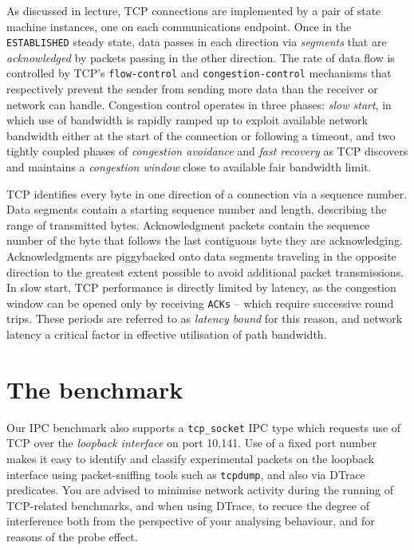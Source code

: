 \documentclass[a4paper,10pt]{article}
\begin{document}
As discussed in lecture, TCP connections are implemented by a pair of state
machine instances, one on each communications endpoint.
Once in the \texttt{ESTABLISHED} steady state, data passes in each direction
via \textit{segments} that are \textit{acknowledged} by packets passing in the
other direction.
The rate of data flow is controlled by TCP's \texttt{flow-control} and
\texttt{congestion-control} mechanisms that respectively prevent the sender
from sending more data than the receiver or network can handle.
Congestion control operates in three phases: \textit{slow start}, in which use
of bandwidth is rapidly ramped up to exploit available network bandwidth
either at the start of the connection or following a timeout, and two tightly
coupled phases of \textit{congestion avoidance} and \textit{fast recovery} as
TCP discovers and maintains a \textit{congestion window} close to available
fair bandwidth limit.

TCP identifies every byte in one direction of a connection via a sequence
number.
Data segments contain a starting sequence number and length, describing the
range of transmitted bytes.
Acknowledgment packets contain the sequence number of the byte that follows
the last contiguous byte they are acknowledging.
Acknowledgments are piggybacked onto data segments traveling in the opposite
direction to the greatest extent possible to avoid additional packet
transmissions.
In slow start, TCP performance is directly limited by latency, as the
congestion window can be opened only by receiving \texttt{ACKs} -- which
require successive round trips.
These periods are referred to as \textit{latency bound} for this reason, and
network latency a critical factor in effective utilisation of path bandwidth.

\section*{The benchmark}

Our IPC benchmark also supports a \texttt{tcp\_socket} IPC
type which requests use of TCP over the \textit{loopback interface} on port
10,141.
Use of a fixed port number makes it easy to identify and classify experimental
packets on the loopback interface using packet-sniffing tools such as
\texttt{tcpdump}, and also via DTrace predicates.
You are advised to minimise network activity during the running of TCP-related
benchmarks, and when using DTrace, to recuce the degree of interference both
from the perspective of your analysing behaviour, and for reasons of the probe
effect.
\end{document}
